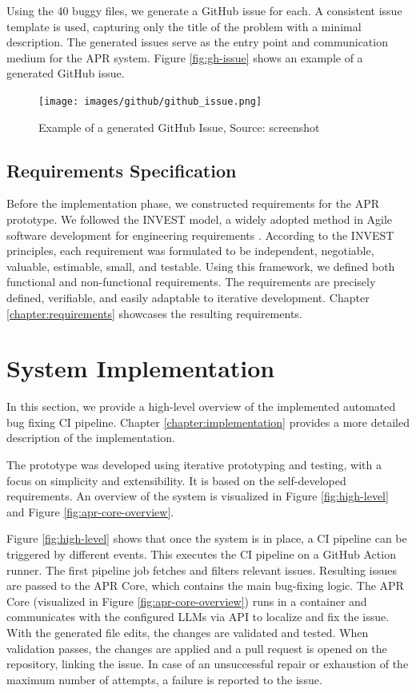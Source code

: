Using the 40 buggy files, we generate a GitHub issue for each. A consistent issue template is used, capturing only the title of the problem with a minimal description. The generated issues serve as the entry point and communication medium for the APR system. Figure \ref{fig:gh-issue} shows an example of a generated GitHub issue.

\begin{figure}[H]
    \centering
    \texttt{[image: images/github/github\_issue.png]}
    \caption{Example of a generated GitHub Issue, Source: screenshot}
    \label{fig:gh-issue2}
\end{figure}

\subsection{Requirements Specification}

Before the implementation phase, we constructed requirements for the \ac{APR} prototype. We followed the INVEST model, a widely adopted method in Agile software development for engineering requirements \cite{10.5555/984017}. According to the INVEST principles, each requirement was formulated to be independent, negotiable, valuable, estimable, small, and testable. Using this framework, we defined both functional and non-functional requirements. The requirements are precisely defined, verifiable, and easily adaptable to iterative development. Chapter \ref{chapter:requirements} showcases the resulting requirements.

\section{System Implementation}

In this section, we provide a high-level overview of the implemented automated bug fixing \ac{CI} pipeline. Chapter \ref{chapter:implementation} provides a more detailed description of the implementation.

The prototype was developed using iterative prototyping and testing, with a focus on simplicity and extensibility. It is based on the self-developed requirements. An overview of the system is visualized in Figure \ref{fig:high-level} and Figure \ref{fig:apr-core-overview}.

Figure \ref{fig:high-level} shows that once the system is in place, a \ac{CI} pipeline can be triggered by different events. This executes the CI pipeline on a GitHub Action runner. The first pipeline job fetches and filters relevant issues. Resulting issues are passed to the APR Core, which contains the main bug-fixing logic. The APR Core (visualized in Figure \ref{fig:apr-core-overview}) runs in a container and communicates with the configured \acp{LLM} via API to localize and fix the issue. With the generated file edits, the changes are validated and tested. When validation passes, the changes are applied and a pull request is opened on the repository, linking the issue. In case of an unsuccessful repair or exhaustion of the maximum number of attempts, a failure is reported to the issue.

